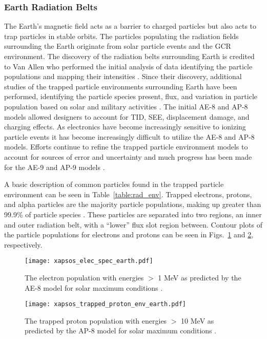 \subsubsection{Earth Radiation Belts} %
\label{ssub:van_allen_radiation_belts}
The Earth's magnetic field acts as a barrier to charged particles but also acts to trap particles in stable orbits.
The particles populating the radiation fields surrounding the Earth originate from solar particle events and the GCR environment.
The discovery of the radiation belts surrounding Earth is credited to Van Allen who performed the initial analysis of data identifying the particle populations and mapping their intensities \cite{van1959radiation}.
Since their discovery, additional studies of the trapped particle environments surrounding Earth have been performed, identifying the particle species present, flux, and variation in particle population based on solar and military activities \cite{sawyer1976ap,vette1991ae}.
The initial AE-8 and AP-8 models allowed designers to account for TID, SEE, displacement damage, and charging effects.
As electronics have become increasingly sensitive to ionizing particle events it has become increasingly difficult to utilize the AE-8 and AP-8 models.
Efforts continue to refine the trapped particle environment models to account for sources of error and uncertainty and much progress has been made for the AE-9 and AP-9 models \cite{barth2003space,Xapsos:2013cu,Bourdarie:kj}.

A basic description of common particles found in the trapped particle environment can be seen in Table~\ref{table:rad_env}.
Trapped electrons, protons, and alpha particles are the majority particle populations, making up greater than 99.9\% of particle species \cite{xapsos:2006}. 
These particles are separated into two regions, an inner and outer radiation belt, with a ``lower'' flux slot region between.
Contour plots of the particle populations for electrons and protons can be seen in Figs.~\ref{fig:earth-trapped-electrons} and \ref{fig:earth-trapped-protons}, respectively.
\begin{figure}[htbp]
    \begin{center}
        \texttt{[image: xapsos\_elec\_spec\_earth.pdf]}
    \end{center}
    \caption[The electron population with energies $>$ 1 MeV as predicted by the AE-8 model for solar maximum conditions.]{The electron population with energies $>$ 1 MeV as predicted by the AE-8 model for solar maximum conditions \cite{xapsos:2006}.}
    \label{fig:earth-trapped-electrons}
\end{figure}
\begin{figure}[htbp]
    \begin{center}
        \texttt{[image: xapsos\_trapped\_proton\_env\_earth.pdf]}
    \end{center}
    \caption[The trapped proton population with energies $>$ 10 MeV as predicted by the AP-8 model for solar maximum conditions.]{The trapped proton population with energies $>$ 10 MeV as predicted by the AP-8 model for solar maximum conditions \cite{xapsos:2006}.}
    \label{fig:earth-trapped-protons}
\end{figure}


